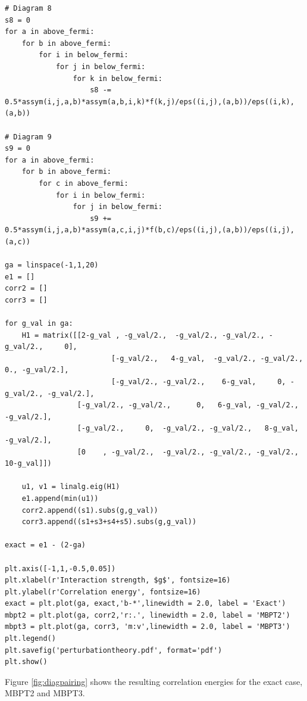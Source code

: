 \begin{lstlisting}
# Diagram 8 
s8 = 0
for a in above_fermi:
    for b in above_fermi:
        for i in below_fermi:
            for j in below_fermi:
                for k in below_fermi:
                    s8 -= 0.5*assym(i,j,a,b)*assym(a,b,i,k)*f(k,j)/eps((i,j),(a,b))/eps((i,k),(a,b))

# Diagram 9 
s9 = 0
for a in above_fermi:
    for b in above_fermi:
        for c in above_fermi:
            for i in below_fermi:
                for j in below_fermi:
                    s9 += 0.5*assym(i,j,a,b)*assym(a,c,i,j)*f(b,c)/eps((i,j),(a,b))/eps((i,j),(a,c))

ga = linspace(-1,1,20)
e1 = []
corr2 = []
corr3 = []

for g_val in ga:
    H1 = matrix([[2-g_val , -g_val/2.,  -g_val/2., -g_val/2., -g_val/2.,     0],
                         [-g_val/2.,   4-g_val,  -g_val/2., -g_val/2.,    0., -g_val/2.],
                         [-g_val/2., -g_val/2.,    6-g_val,     0, -g_val/2., -g_val/2.],
                 [-g_val/2., -g_val/2.,      0,   6-g_val, -g_val/2., -g_val/2.],
                 [-g_val/2.,     0,  -g_val/2., -g_val/2.,   8-g_val, -g_val/2.],
                 [0    , -g_val/2.,  -g_val/2., -g_val/2., -g_val/2.,  10-g_val]])

    u1, v1 = linalg.eig(H1)
    e1.append(min(u1))
    corr2.append((s1).subs(g,g_val))
    corr3.append((s1+s3+s4+s5).subs(g,g_val))

exact = e1 - (2-ga)

plt.axis([-1,1,-0.5,0.05])
plt.xlabel(r'Interaction strength, $g$', fontsize=16)
plt.ylabel(r'Correlation energy', fontsize=16)
exact = plt.plot(ga, exact,'b-*',linewidth = 2.0, label = 'Exact')
mbpt2 = plt.plot(ga, corr2,'r:.', linewidth = 2.0, label = 'MBPT2')
mbpt3 = plt.plot(ga, corr3, 'm:v',linewidth = 2.0, label = 'MBPT3')
plt.legend()
plt.savefig('perturbationtheory.pdf', format='pdf')
plt.show()
\end{lstlisting}
Figure \ref{fig:diagpairing} shows the resulting correlation energies for the exact case, MBPT2 and MBPT3.
